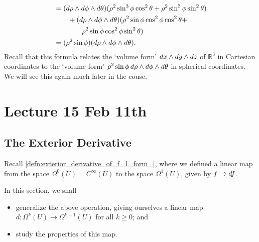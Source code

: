 \documentclass[notoc,notitlepage]{tufte-book}
\begin{document}
\begin{eg}
\begin{align*}
    &= (\dif{\rho} \land \dif{\phi} \land \dif{\theta})(\rho^2 \sin^3 \phi \cos^2 \theta +
      \rho^2 \sin^3 \phi \sin^2 \theta) \\
    &\qquad + (\dif{\rho} \land \dif{\phi} \land \dif{\theta})(\rho^2 \sin \phi \cos^2
      \phi \cos^2 \theta + \\
    &\qquad \qquad \rho^2 \sin \phi \cos^2 \phi \sin^2 \theta) \\
    &= (\rho^2 \sin \phi)(\dif{\rho} \land \dif{\phi} \land \dif{\theta}).
  \end{align*}
  Recall that this formula relates the `volume form' $\mathop{}\!d{x} \land \mathop{}\!d{y} \land \mathop{}\!d{z}$
  of $\mathbb{R}^3$ in Cartesian coordinates to the `volume form' $\rho^2 \sin \phi
  \mathop{}\!d{\rho} \land \mathop{}\!d{\phi} \land \mathop{}\!d{\theta}$ in spherical coordinates. We will see
  this again much later in the couse.
\end{eg}



\chapter{Lecture 15 Feb 11th}%
\label{chp:lecture_15_feb_11th}

\section{The Exterior Derivative}%
\label{sec:the_exterior_derivative}

Recall \cref{defn:exterior_derivative_of_f_1_form_}, where we defined a linear map from
the space $\Omega^0(U) = C^\infty(U)$ to the space $\Omega^1(U)$, given by $f \to
\mathop{}\!d{f}$.

In this section, we shall
\begin{itemize}
  \item generalize the above operation, giving ourselves a linear map $d : \Omega^k(U) \to
    \Omega^{k + 1}(U)$ for all $k \geq 0$; and
  \item study the properties of this map.
\end{itemize}
\end{document}
